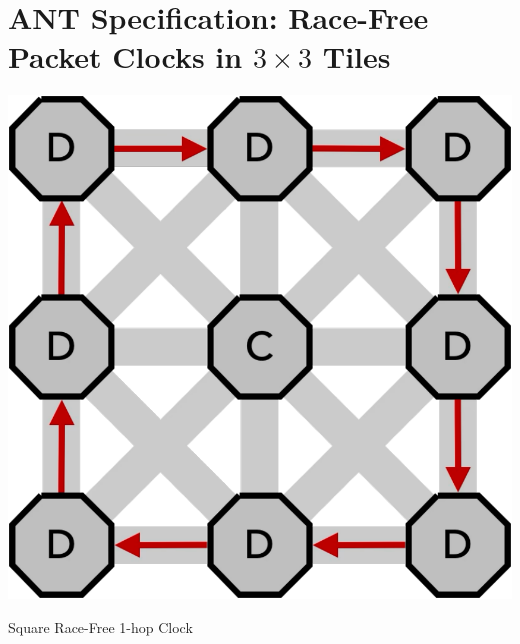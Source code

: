 \section{ANT Specification: Race-Free Packet Clocks in $3 \times 3$ Tiles}
 \begin{marginfigure}
        \includegraphics[width=\linewidth,trim=0mm 0mm 0mm 0mm, clip]{../../FIGURES/3x3-clockwise.pdf} %
  \caption{Square Race-Free 1-hop Clock}
    \vspace{10pt}
\end{marginfigure}




